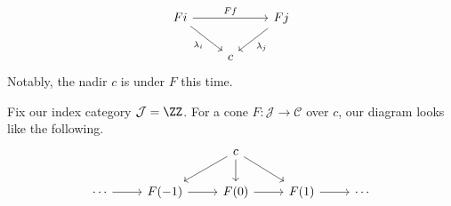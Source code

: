\[\begin{tikzcd}
	Fi && Fj \\
	& c
	\arrow["Ff", from=1-1, to=1-3]
	\arrow["{\lambda_i}"', from=1-1, to=2-2]
	\arrow["{\lambda_j}", from=1-3, to=2-2]
\end{tikzcd}\]
Notably, the nadir $c$ is under $F$ this time.
\begin{example}
	Fix our index category $\mathcal J=\ZZ$. For a cone $F:\mathcal J\to\mathcal C$ over $c$, our diagram looks like the following.
	\[\begin{tikzcd}
		&& c \\
		\cdots & {F(-1)} & {F(0)} & {F(1)} & \cdots
		\arrow[from=2-1, to=2-2]
		\arrow[from=2-2, to=2-3]
		\arrow[from=2-3, to=2-4]
		\arrow[from=2-4, to=2-5]
		\arrow[from=1-3, to=2-2]
		\arrow[from=1-3, to=2-3]
		\arrow[from=1-3, to=2-4]
	\end{tikzcd}\]
\end{example}

